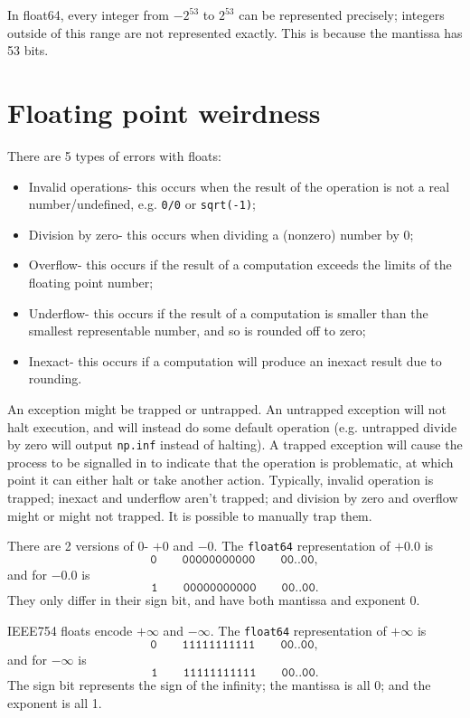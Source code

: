 \documentclass[a4paper, openany]{memoir}
\begin{document}
    In float64, every integer from $-2^{53}$ to $2^{53}$ can be represented precisely; integers outside of this range are not represented exactly. This is because the mantissa has 53 bits.
    \newpage

    \section{Floating point weirdness}
    There are 5 types of errors with floats:
    \begin{itemize}
        \item Invalid operations- this occurs when the result of the operation is not a real number/undefined, e.g. \texttt{0/0} or \texttt{sqrt(-1)};
        \item Division by zero- this occurs when dividing a (nonzero) number by 0;
        \item Overflow- this occurs if the result of a computation exceeds the limits of the floating point number;
        \item Underflow- this occurs if the result of a computation is smaller than the smallest representable number, and so is rounded off to zero;
        \item Inexact- this occurs if a computation will produce an inexact result due to rounding.
    \end{itemize}

    An exception might be trapped or untrapped. An untrapped exception will not halt execution, and will instead do some default operation (e.g. untrapped divide by zero will output \texttt{np.inf} instead of halting). A trapped exception will cause the process to be signalled in to indicate that the operation is problematic, at which point it can either halt or take another action. Typically, invalid operation is trapped; inexact and underflow aren't trapped; and division by zero and overflow might or might not trapped. It is possible to manually trap them.

    There are 2 versions of 0- $+0$ and $-0$. The \texttt{float64} representation of $+0.0$ is
    \[\texttt{0} \qquad \texttt{00000000000} \qquad \texttt{00..00},\]        
    and for $-0.0$ is
    \[\texttt{1} \qquad \texttt{00000000000} \qquad \texttt{00..00}.\]
    They only differ in their sign bit, and have both mantissa and exponent 0.
    
    IEEE754 floats encode $+ \infty$ and $-\infty$. The \texttt{float64} representation of $+\infty$ is
    \[\texttt{0} \qquad \texttt{11111111111} \qquad \texttt{00..00},\]        
    and for $-\infty$ is
    \[\texttt{1} \qquad \texttt{11111111111} \qquad \texttt{00..00}.\]        
    The sign bit represents the sign of the infinity; the mantissa is all 0; and the exponent is all 1.
\end{document}
